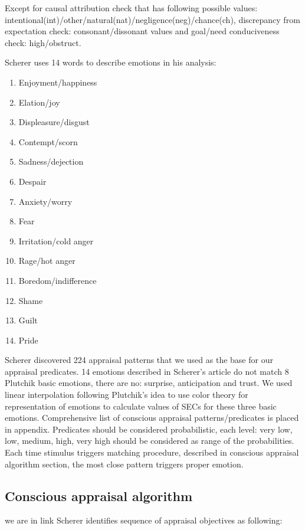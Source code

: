 Except for causal attribution check that has following possible values: intentional(int)/other/natural(nat)/negligence(neg)/chance(ch),  discrepancy from expectation check: consonant/dissonant values and goal/need conduciveness check: high/obstruct.

Scherer uses 14 words to describe emotions in his analysis:

\begin{enumerate}
\item  Enjoyment/happiness
\item  Elation/joy
\item  Displeasure/disgust
\item  Contempt/scorn
\item  Sadness/dejection
\item  Despair
\item  Anxiety/worry
\item  Fear
\item  Irritation/cold anger
\item  Rage/hot anger
\item  Boredom/indifference
\item  Shame
\item  Guilt
\item  Pride
\end{enumerate}

Scherer discovered 224 appraisal patterns that we used as the base for our appraisal predicates. 14 emotions described in Scherer's article do not match 8 Plutchik basic emotions, there are no: surprise, anticipation and trust. We used linear interpolation following Plutchik's idea to use color theory for representation of emotions to calculate values of SECs for these three basic emotions. Comprehensive list of conscious appraisal patterns/predicates is placed in appendix. Predicates should be considered probabilistic, each level: very low, low, medium, high, very high should be considered as range of the probabilities. Each time stimulus triggers matching procedure, described in conscious appraisal algorithm section, the most close pattern triggers proper emotion.

\subsection{Conscious appraisal algorithm}

we are in link
Scherer identifies \cite{appraisal_as_sequential_checking} sequence of appraisal objectives as following:

